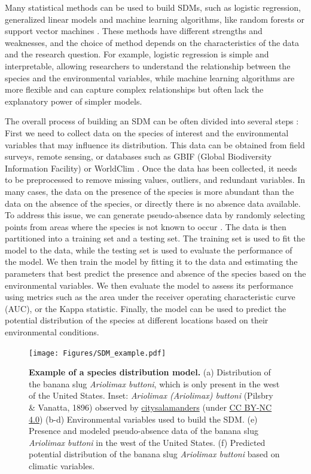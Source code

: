 Many statistical methods can be used to build SDMs, such as logistic
regression, generalized linear models and machine learning algorithms, like
random forests or support vector machines \cite{Franklin2010}. These methods
have different strengths and weaknesses, and the choice of method depends on
the characteristics of the data and the research question. For example,
logistic regression is simple and interpretable, allowing researchers to
understand the relationship between the species and the environmental
variables, while machine learning algorithms are more flexible and can capture
complex relationships but often lack the explanatory power of simpler models.

The overall process of building an SDM can be often divided into several steps
\cite{Elith2006}: First we need to collect data on the species of interest and
the environmental variables that may influence its distribution. This data can
be obtained from field surveys, remote sensing, or databases such as GBIF
(Global Biodiversity Information Facility) \cite{GBIF} or WorldClim
\cite{WorldClim}. Once the data has been collected, it needs to be preprocessed
to remove missing values, outliers, and redundant variables. In many cases, the
data on the presence of the species is more abundant than the data on the
absence of the species, or directly there is no absence data available. To
address this issue, we can generate pseudo-absence data by randomly selecting
points from areas where the species is not known to occur \cite{Iturbide2015}.
The data is then partitioned into a training set and a testing set. The
training set is used to fit the model to the data, while the testing set is
used to evaluate the performance of the model. We then train the model by
fitting it to the data and estimating the parameters that best predict the
presence and absence of the species based on the environmental variables. We
then evaluate the model to assess its performance using metrics such as the
area under the receiver operating characteristic curve (AUC), or the Kappa
statistic. Finally, the model can be used to predict the potential distribution
of the species at different locations based on their environmental conditions.

\begin{figure}[H]
  \centering
  \texttt{[image: Figures/SDM\_example.pdf]}
  \caption[Example of a species distribution model]{
    \textbf{Example of a species distribution model.} (a) Distribution of
    the banana slug \textit{Ariolimax buttoni}, which is only present in the
    west of the United States. Inset:  \textit{Ariolimax (Ariolimax) buttoni}
    (Pilsbry \& Vanatta, 1896) observed by
    \href{https://www.inaturalist.org/photos/345291902}{citysalamanders} (under
    \href{http://creativecommons.org/licenses/by-nc/4.0/}{CC BY-NC 4.0}) (b-d)
    Environmental variables used to build the SDM. (e) Presence and modeled
    pseudo-absence data of the banana slug \textit{Ariolimax buttoni} in the
    west of the United States. (f) Predicted potential distribution of the
    banana slug \textit{Ariolimax buttoni} based on climatic variables.}
  \label{fig:SDM_example}
\end{figure}

